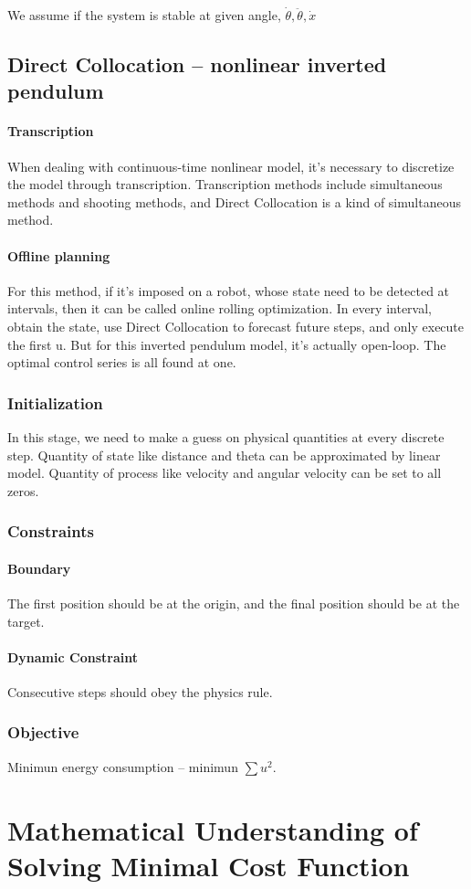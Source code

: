 \documentclass{article}
\begin{document}
We assume if the system is stable at given angle, $\dot{\theta}, \ddot{\theta}, \dot{x} $


\subsection{Direct Collocation -- nonlinear inverted pendulum}
\paragraph{Transcription} When dealing with continuous-time nonlinear model, it's necessary to discretize the model through transcription. Transcription methods include simultaneous methods and shooting methods, and Direct Collocation is a kind of simultaneous method.
\paragraph{Offline planning} For this method, if it's imposed on a robot, whose state need to be detected at intervals, then it can be called online rolling optimization. In every interval, obtain the state, use Direct Collocation to forecast future steps, and only execute the first u. But for this inverted pendulum model, it's actually open-loop. The optimal control series is all found at one.
\subsubsection{Initialization}
In this stage, we need to make a guess on physical quantities at every discrete step. Quantity of state like distance and theta can be approximated by linear model. Quantity of process like velocity and angular velocity can be set to all zeros.
\subsubsection{Constraints}
\paragraph{Boundary} The first position should be at the origin, and the final position should be at the target.
\paragraph{Dynamic Constraint} Consecutive steps should obey the physics rule. 
\subsubsection{Objective} Minimun energy consumption --  minimun $\sum{u^2}$.

\section{Mathematical Understanding of Solving Minimal Cost Function}
\end{document}
